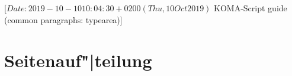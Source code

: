 %
%
%
%
%
%
%
%
% 
%
%
%
%

                 [$Date: 2019-10-10 10:04:30 +0200 (Thu, 10 Oct 2019) $
                  KOMA-Script guide (common paragraphs: typearea)]


\section{\texorpdfstring{Seitenauf"|teilung}{Seitenaufteilung}}
\BeginIndexGroup
{}

